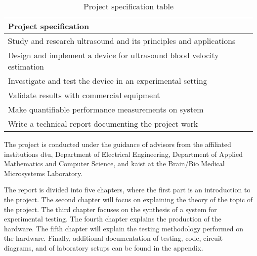 \begin{table}[ht]
	\centering
	\begin{tabular}{@{}l@{}}
		\toprule
		\textbf{Project specification}									\\ \midrule
		Study and research ultrasound and its principles and applications	\\
		Design and implement a device for ultrasound blood velocity estimation	\\
		Investigate and test the device in an experimental setting		\\
		Validate results with commercial equipment 						\\
		Make quantifiable performance measurements on system			\\
		Write a technical report documenting the project work			\\ \bottomrule
	\end{tabular}
	\caption{Project specification table}
	\label{tab:specifications}
\end{table}

The project is conducted under the guidance of advisors from the affiliated institutions \Gls{dtu}, Department of Electrical Engineering, Department of Applied Mathematics and Computer Science, and \Gls{kaist} at the Brain/Bio Medical Microsystems Laboratory.

The report is divided into five chapters, where the first part is an introduction to the project. The second chapter will focus on explaining the theory of the topic of the project. The third chapter focuses on the synthesis of a system for experimental testing. The fourth chapter explains the production of the hardware. The fifth chapter will explain the testing methodology performed on the hardware. Finally, additional documentation of testing, code, circuit diagrams, and of laboratory setups can be found in the appendix.